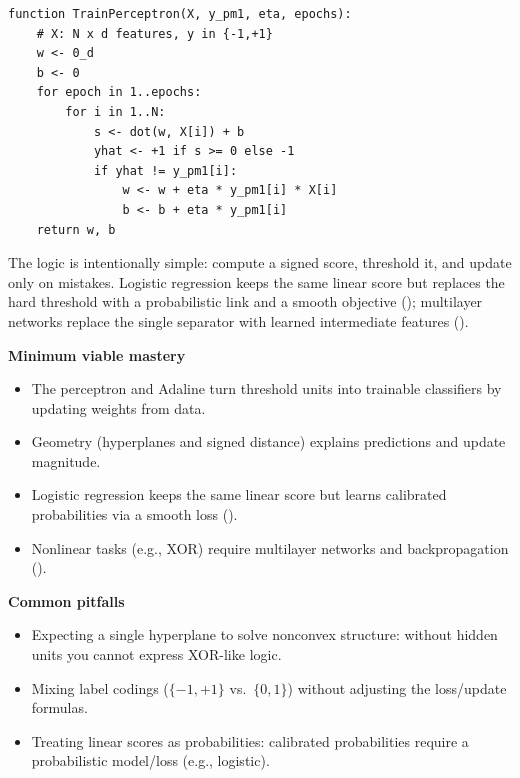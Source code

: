 \begin{tcolorbox}[summarybox, breakable, title={Perceptron learning loop (pseudocode)}]
\footnotesize
\begin{verbatim}
function TrainPerceptron(X, y_pm1, eta, epochs):
    # X: N x d features, y in {-1,+1}
    w <- 0_d
    b <- 0
    for epoch in 1..epochs:
        for i in 1..N:
            s <- dot(w, X[i]) + b
            yhat <- +1 if s >= 0 else -1
            if yhat != y_pm1[i]:
                w <- w + eta * y_pm1[i] * X[i]
                b <- b + eta * y_pm1[i]
    return w, b
\end{verbatim}
\normalsize
The logic is intentionally simple: compute a signed score, threshold it, and update only on mistakes. Logistic regression keeps the same linear score but replaces the hard threshold with a probabilistic link and a smooth objective (); multilayer networks replace the single separator with learned intermediate features ().
\end{tcolorbox}

\begin{tcolorbox}[summarybox, title={Key takeaways}]
\textbf{Minimum viable mastery}
\begin{itemize}
    \item The perceptron and Adaline turn threshold units into trainable classifiers by updating weights from data.
    \item Geometry (hyperplanes and signed distance) explains predictions and update magnitude.
    \item Logistic regression keeps the same linear score but learns calibrated probabilities via a smooth loss ().
    \item Nonlinear tasks (e.g., XOR) require multilayer networks and backpropagation ().
\end{itemize}
\medskip
\textbf{Common pitfalls}
\begin{itemize}
    \item Expecting a single hyperplane to solve nonconvex structure: without hidden units you cannot express XOR-like logic.
    \item Mixing label codings (\(\{-1,+1\}\) vs.\ \(\{0,1\}\)) without adjusting the loss/update formulas.
    \item Treating linear scores as probabilities: calibrated probabilities require a probabilistic model/loss (e.g., logistic).
\end{itemize}
\end{tcolorbox}

